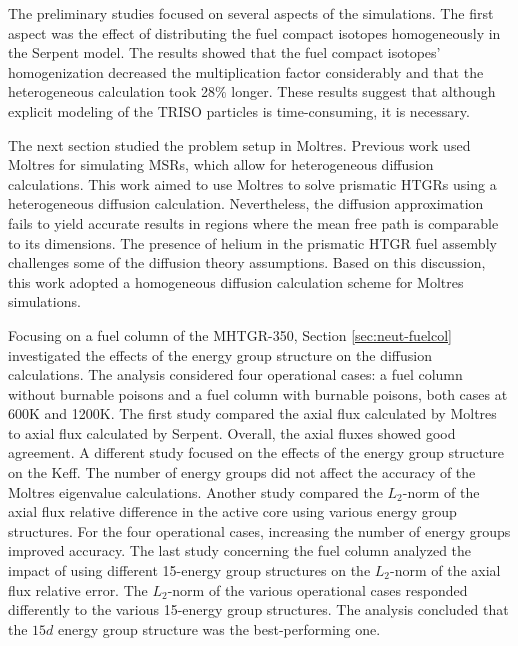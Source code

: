 The preliminary studies focused on several aspects of the simulations.
The first aspect was the effect of distributing the fuel compact isotopes homogeneously in the Serpent model.
The results showed that the fuel compact isotopes' homogenization decreased the multiplication factor considerably and that the heterogeneous calculation took 28$\%$ longer.
These results suggest that although explicit modeling of the TRISO particles is time-consuming, it is necessary.

The next section studied the problem setup in Moltres.
Previous work used Moltres for simulating MSRs, which allow for heterogeneous diffusion calculations.
This work aimed to use Moltres to solve prismatic HTGRs using a heterogeneous diffusion calculation.
Nevertheless, the diffusion approximation fails to yield accurate results in regions where the mean free path is comparable to its dimensions.
The presence of helium in the prismatic HTGR fuel assembly challenges some of the diffusion theory assumptions.
Based on this discussion, this work adopted a homogeneous diffusion calculation scheme for Moltres simulations.

Focusing on a fuel column of the MHTGR-350, Section \ref{sec:neut-fuelcol} investigated the effects of the energy group structure on the diffusion calculations.
The analysis considered four operational cases: a fuel column without burnable poisons and a fuel column with burnable poisons, both cases at 600K and 1200K.
The first study compared the axial flux calculated by Moltres to axial flux calculated by Serpent.
Overall, the axial fluxes showed good agreement.
A different study focused on the effects of the energy group structure on the \gls{Keff}.
The number of energy groups did not affect the accuracy of the Moltres eigenvalue calculations.
Another study compared the $L_2$-norm of the axial flux relative difference in the active core using various energy group structures.
For the four operational cases, increasing the number of energy groups improved accuracy.
The last study concerning the fuel column analyzed the impact of using different 15-energy group structures on the $L_2$-norm of the axial flux relative error.
The $L_2$-norm of the various operational cases responded differently to the various 15-energy group structures.
The analysis concluded that the $15d$ energy group structure was the best-performing one.

